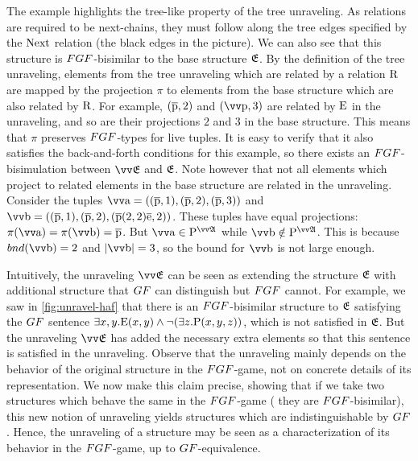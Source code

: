 \noindent
The example highlights the tree-like property of the tree unraveling.
As relations are required to be next-chains, they must follow along the tree edges specified by the $\mathrm{Next}$ relation (the black edges in the picture).
We can also see that this structure is $\FGF$-bisimilar to the base structure ${\mathfrak{E}}$.
By the definition of the tree unraveling, elements from the tree unraveling which are related by a relation $\mathrm{R}$ are mapped by the projection $\pi$ to elements from the base structure which are also related by $\mathrm{R}$.
For example, $(\overline{\mathrm{p}}, 2)$ and $(\elemtuptuplep, 3)$ are related by $\mathrm{E}$ in the unraveling, and so are their projections $2$ and $3$ in the base structure.
This means that $\pi$ preserves $\FGF$-types for live tuples.
It is easy to verify that it also satisfies the back-and-forth conditions for this example, so there exists an $\FGF$-bisimulation between $\unravel{E}$ and ${\mathfrak{E}}$.
Note however that not all elements which project to related elements in the base structure are related in the unraveling.
Consider the tuples $\elemtuptuplea = ((\elemtuplep, 1), (\elemtuplep, 2), (\elemtuplep, 3))$ and $\elemtuptupleb = ((\elemtuplep, 1), (\elemtuplep, 2), (\elemtuplep(2,2)\elemtuplee, 2))$.
These tuples have equal projections: $\pi(\elemtuptuplea) = \pi(\elemtuptupleb) = \elemtuplep$.
But $\elemtuptuplea \in \relP^{\unravel{A}}$ while $\elemtuptupleb \notin \relP^{\unravel{A}}$.
This is because $\bound{\elemtuptupleb} = 2$ and $|\elemtuptupleb| = 3$, so the bound for $\elemtuptupleb$ is not large enough.

Intuitively, the unraveling $\unravel{E}$ can be seen as extending the structure ${\mathfrak{E}}$ with additional structure that $\GF$ can distinguish but $\FGF$ cannot.
For example, we saw in \cref{fig:unravel-haf} that there is an $\FGF$-bisimilar structure to ${\mathfrak{E}}$ satisfying the $\GF$ sentence $\exists{x,y}. \mathrm{E}(x,y) \land \lnot (\exists z. \mathrm{P}(x,y,z))$, which is not satisfied in ${\mathfrak{E}}$.
But the unraveling $\unravel{E}$ has added the necessary extra elements so that this sentence is satisfied in the unraveling.
Observe that the unraveling mainly depends on the behavior of the original structure in the $\FGF$-game, not on concrete details of its representation.
We now make this claim precise, showing that if we take two structures which behave the same in the $\FGF$-game (\ie{} they are $\FGF$-bisimilar), this new notion of unraveling yields structures which are indistinguishable by $\GF$.
Hence, the unraveling of a structure may be seen as a characterization of its behavior in the $\FGF$-game, up to $\GF$-equivalence.

